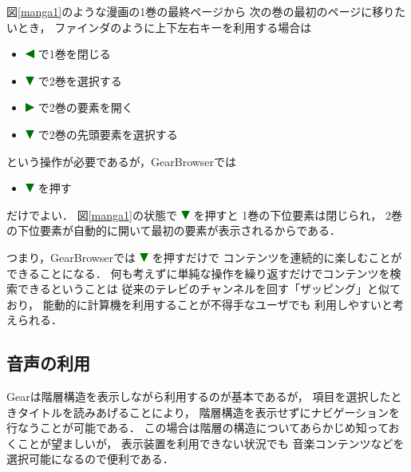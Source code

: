 \documentclass[twoside]{wiss}
\def\GEAR{\textsf{Gear}}
\def\GB{\textsf{GearBrowser}}
\def\down{ \includegraphics[width=3mm,bb=0 0 36 36]{figures/downtriangle.pdf} }
\def\right{ \includegraphics[width=3mm,bb=0 0 36 36]{figures/righttriangle.pdf} }
\def\left{ \includegraphics[width=3mm,bb=0 0 36 36]{figures/lefttriangle.pdf} }
\begin{document}
\noindent
図\ref{manga1}のような漫画の1巻の最終ページから
次の巻の最初のページに移りたいとき，
ファインダのように上下左右キーを利用する場合は

\begin{itemize}
\item {\left}で1巻を閉じる
\item {\down}で2巻を選択する
\item {\right}で2巻の要素を開く
\item {\down}で2巻の先頭要素を選択する
\end{itemize}

\noindent
という操作が必要であるが，{\GB}では

\begin{itemize}
\item {\down}を押す
\end{itemize}

\noindent
だけでよい．
図\ref{manga1}の状態で{\down}を押すと
1巻の下位要素は閉じられ，
2巻の下位要素が自動的に開いて最初の要素が表示されるからである．

つまり，{\GB}では{\down}を押すだけで
コンテンツを連続的に楽しむことができることになる．
何も考えずに単純な操作を繰り返すだけでコンテンツを検索できるということは
従来のテレビのチャンネルを回す「ザッピング」と似ており，
能動的に計算機を利用することが不得手なユーザでも
利用しやすいと考えられる．


\subsection{音声の利用}

{\GEAR}は階層構造を表示しながら利用するのが基本であるが，
項目を選択したときタイトルを読みあげることにより，
階層構造を表示せずにナビゲーションを行なうことが可能である．
この場合は階層の構造についてあらかじめ知っておくことが望ましいが，
表示装置を利用できない状況でも
音楽コンテンツなどを選択可能になるので便利である．

% 
\end{document}
